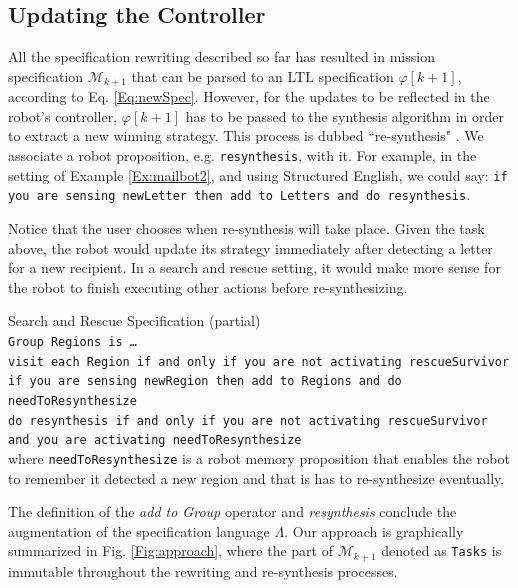 \subsection{Updating the Controller}

All the specification rewriting described so far has resulted in mission specification $\mathcal{M}_{k+1}$ that can be parsed to an LTL specification $\varphi [k+1]$, according to Eq. \eqref{Eq:newSpec}. However, for the updates to be reflected in the robot's controller, $\varphi [k+1]$ has to be passed to the synthesis algorithm in order to extract a new winning strategy. This process is dubbed ``re-synthesis" \cite{BingxinRSS2012}. We associate a robot proposition, e.g. \texttt{resynthesis}, with it. For example, in the setting of Example \ref{Ex:mailbot2}, and using Structured English, we could say:
\texttt{if you are sensing newLetter then add to Letters and do resynthesis}. 

Notice that the user chooses when re-synthesis will take place. Given the task above, the robot would update its strategy immediately after detecting a letter for a new recipient. In a search and rescue setting, it would make more sense for the robot to finish executing other actions before re-synthesizing.

\begin{myExample}\label{Ex:SnS} Search and Rescue Specification (partial)\\
	\texttt{Group Regions is \ldots}\\
	\texttt{visit each Region if and only if you are not activating rescueSurvivor}\\
	\texttt{if you are sensing newRegion then add to Regions and do needToResynthesize}\\
	\texttt{do resynthesis if and only if you are not activating rescueSurvivor and you are activating needToResynthesize}\\
	where \texttt{needToResynthesize} is a robot memory proposition that enables the robot to remember it detected a new region and that is has to re-synthesize eventually.
\end{myExample}

The definition of the \emph{add to Group} operator and \emph{resynthesis} conclude the augmentation of the specification language $\Lambda$. Our approach is graphically summarized in Fig. \ref{Fig:approach}, where  the part of $\mathcal{M}_{k+1}$ denoted as \texttt{Tasks} is immutable throughout the rewriting and re-synthesis processes.

